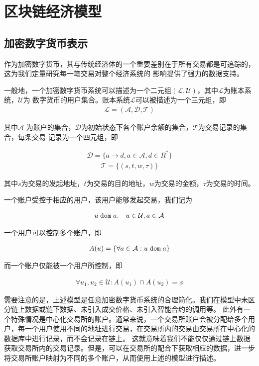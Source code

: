 \section{区块链经济模型}


\subsection{加密数字货币表示}
作为加密数字货币，其与传统经济体的一个重要差别在于所有交易都是可追踪的，这为我们定量研究每一笔交易对整个经济系统的
影响提供了强力的数据支持。

一般地，一个加密数字货币系统可以描述为一个二元组$(\mathcal{L}, \mathcal{U})$，其中$\mathcal{L}$为账本系统，$\mathcal{U}$为
数字货币的用户集合。账本系统$\mathcal{L}$可以被描述为一个三元组，即
\begin{align}
\mathcal{L} = (\mathcal{A}, \mathcal{D}, \mathcal{T})
\end{align}

\noindent 其中$\mathcal{A}$ 为账户的集合，$\mathcal{D}$为初始状态下各个账户余额的集合，$\mathcal{T}$为交易记录的集合，每条交易
记录为一个四元组，即

\begin{align}
\mathcal{D} = \{a \rightarrow d, a{\in}\mathcal{A}, d{\in}R^*\}
\end{align}
\begin{align}
\mathcal{T} = \{(s, t, w, \tau)\}
\end{align}

\noindent 其中$s$为交易的发起地址，$t$为交易的目的地址，$w$为交易的金额，$\tau$为交易的时间。

一个账户受控于相应的用户，该用户能够发起交易，我们记为

\begin{align}
u {\; \texttt{dom}\;} a. \quad u\in \mathcal{U}, a\in \mathcal{A}
\end{align}

\noindent 一个用户可以控制多个账户，即

\begin{align}
A(u) = \{\forall a\in \mathcal{A} : u {\; \texttt{dom}\;} a\}
\end{align}

\noindent 而一个账户仅能被一个用户所控制，即

\begin{align}
\forall u_1, u_2 \in \mathcal{U} : A(u_1) \cap A(u_2) = \phi
\end{align}

需要注意的是，上述模型是任意加密数字货币系统的合理简化。我们在模型中未区分链上数据或链下数据、未引入成交价格、未引入智能合约的调用等。
此外有一个特殊情况是中心化交易所的账户。通常来说，一个交易所账户会被分配给多个用户，每一个用户使用不同的地址进行交易，在交易所内的交易由交易所在中心化的数据库中进行记录，而不会记录在链上。
这就意味着我们不能仅仅通过链上数据获取交易所内的交易记录。但是，可以在交易所的配合下获取相应的数据，进一步将交易所账户映射为不同的多个账户，从而使用上述的模型进行描述。



